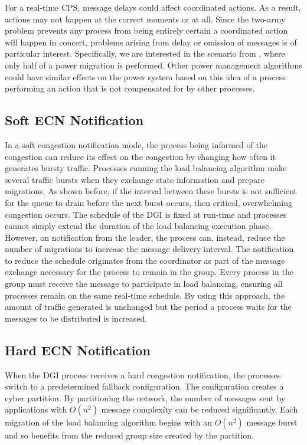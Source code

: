 For a real-time \ac{CPS}, message delays could affect coordinated actions.
As a result, actions may not happen at the correct moments or at all.
Since the two-army problem prevents any process from being entirely certain a coordinated action will happen in concert, problems arising from delay or omission of messages is of particular interest.
Specifically, we are interested in the scenario from \cite{HARINI}, where only half of a power migration is performed.
Other power management algorithms could have similar effects on the power system based on this idea of a process performing an action that is not compensated for by other processes.

\subsection{Soft ECN Notification}

In a soft congestion notification mode, the process being informed of the congestion can reduce its effect on the congestion by changing how often it generates bursty traffic.
Processes running the load balancing algorithm make several traffic bursts when they exchange state information and prepare migrations.
As shown before, if the interval between these bursts is not sufficient for the queue to drain before the next burst occurs, then critical, overwhelming congestion occurs.
The schedule of the \ac{DGI} is fixed at run-time and processes cannot simply extend the duration of the load balancing execution phase.
However, on notification from the leader, the process can, instead, reduce the number of migrations to increase the message delivery interval.
The notification to reduce the schedule originates from the coordinator as part of the message exchange necessary for the process to remain in the group.
Every process in the group must receive the message to participate in load balancing, ensuring all processes remain on the same real-time schedule.
By using this approach, the amount of traffic generated is unchanged but the period a process waits for the messages to be distributed is increased.

\subsection{Hard ECN Notification}

When the \ac{DGI} process receives a hard congestion notification, the processes switch to a predetermined fallback configuration.
The configuration creates a cyber partition.
By partitioning the network, the number of messages sent by applications with $O(n^2)$ message complexity can be reduced significantly.
Each migration of the load balancing algorithm begins with an $O(n^2)$ message burst and so benefits from the reduced group size created by the partition.

